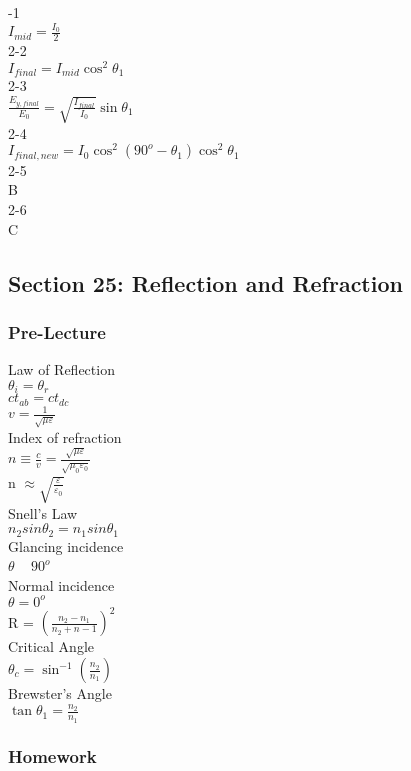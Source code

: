 \documentclass{article}
\begin{document}
\vspace{2mm}

-1 \\
$I_{mid} = \frac{I_0}{2}$ \\
2-2 \\
$I_{final} = I_{mid} \cos^2 \theta_1$ \\
2-3 \\
$\frac{E_{y,final}}{E_0} = \sqrt{\frac{I_{final}}{I_0}} \sin \theta_1$ \\
2-4 \\
$I_{final,new} = I_0 \cos^2(90^o - \theta_1) \cos^2 \theta_1$ \\
2-5 \\
B \\
2-6 \\
C

\subsection{Section 25: Reflection and Refraction}
\subsubsection{Pre-Lecture}
\noindent
Law of Reflection \\
$\theta_i = \theta_r$ \\
$ct_{ab}=ct_{dc}$ \\
$v = \frac{1}{\sqrt{\mu \varepsilon}}$ \\
Index of refraction \\
$n \equiv \frac{c}{v} = \frac{\sqrt{\mu \varepsilon}}{\sqrt{\mu_0 \varepsilon_0}}$ \\
n $\approx \sqrt{\frac{\varepsilon}{\varepsilon_0}}$ \\
Snell's Law \\
$n_2 sin \theta_2 = n_1 sin \theta_1$ \\
Glancing incidence \\
$\theta$ ~ $90^o$ \\
Normal incidence \\
$\theta = 0^o$ \\
R = $(\frac{n_2 - n_1}{n_2 + n-1})^2$ \\
Critical Angle \\
$\theta_c = \sin^{-1}(\frac{n_2}{n_1})$ \\
Brewster's Angle \\
$\tan \theta_1 = \frac{n_2}{n_1}$
\subsubsection{Homework}
\end{document}
